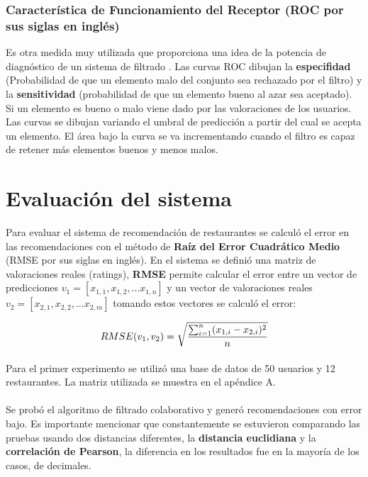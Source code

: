 \documentclass[12pt,letterpaper,oneside] {memoir}
\begin{document}
\subsubsection{Característica de Funcionamiento del Receptor (ROC por sus siglas en inglés)}

 Es otra medida muy utilizada que proporciona una idea de la potencia de diagnóstico de un sistema de filtrado \citep{Hanley1982, Herlocker2004}. Las curvas ROC dibujan la  \textbf{especifidad} (Probabilidad de que un elemento malo del conjunto sea rechazado por el filtro) y la  \textbf{sensitividad} (probabilidad de que un elemento bueno al azar sea aceptado). Si un elemento es bueno o malo viene dado por las valoraciones de los usuarios. Las curvas se dibujan variando el umbral de predicción a partir del cual se acepta un elemento. El área bajo la curva se va incrementando cuando el filtro es capaz de retener más elementos buenos y menos malos.

\section{Evaluación del sistema}
Para evaluar el sistema de recomendación de restaurantes se calculó el error en las recomendaciones con el método de \textbf{Raíz del Error Cuadrático Medio} (RMSE por sus siglas en inglés).  En el sistema se definió una matriz de valoraciones reales (ratings), \textbf{RMSE} permite calcular el error entre un vector de predicciones \textit{$\displaystyle v_{1}= [x_{1,1},x_{1,2},...x_{1,n}]$} y un vector de valoraciones reales \textit{$\displaystyle v_{2}= [x_{2,1},x_{2,2},...x_{2,m}]$} tomando estos vectores se calculó el error:

\begin{equation}
\displaystyle RMSE(v_{1},v_{2}) = \sqrt{\sum_{i=1}^{n}(x_{1,i}-x_{2,i})^{2}\over n}
\end{equation}

\paragraph{}
Para el primer experimento se utilizó una base de datos de 50 usuarios y 12 restaurantes.  La matriz utilizada se muestra en el apéndice A.
\paragraph*{}
Se probó el algoritmo de filtrado colaborativo y generó recomendaciones con error bajo. Es importante mencionar que constantemente se estuvieron comparando las pruebas usando dos distancias diferentes, la \textbf{distancia euclidiana} y la \textbf{correlación de Pearson}, la diferencia en los resultados fue en la mayoría de los casos, de decimales.\\
\end{document}

